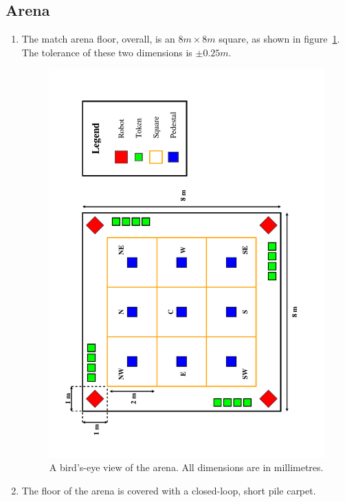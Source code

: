 \subsection{Arena}
\label{sub:arena}
\begin{enumerate}
\item The match arena floor, overall, is an $8m \times 8m$ square, as shown in figure~\ref{fig:arena-dim}.
      The tolerance of these two dimensions is $\pm0.25m$.

\begin{figure}
  \centering
  \includegraphics[width=\textwidth]{./images/arena.pdf}
  \caption{\label{fig:arena-dim}A bird's-eye view of the arena. All dimensions are in millimetres.}
\end{figure}

\item The floor of the arena is covered with a closed-loop, short pile carpet.


\end{enumerate}
